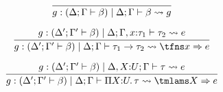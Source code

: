   \centering
{}
\newcommand{\ghole}{%
  \Delta^\prime ; \Gamma^\prime \mid \tau^\prime
}
%
\newcommand{\conc}[2]{%
  \unrolljudg{\goalwith {\goalctx{^\prime}} \beta}{\goalctx{}}{#1}{#2}
}
\newcommand{\prem}[2]{%
  \unrolljudg{\goalwith {\goalctx{^\prime}} \beta}{#1}{e}{#2}
}
%
\[
  \begin{array}{c}
  \infer{%
    \unrolljudg{\goalwith{\goalctx{}} \beta}{\goalctx{}}{g}{\beta}
  }{
  }
    \\[1em]
  \infer{%
    \conc{\tfns x \bto e}{\tau_1 \to \tau_2}
  }{
    \prem{\Delta; \Gamma, x{:}\tau_1}{\tau_2}
  }
  \\[1em]
  \infer{%
    \conc{\tmlams X \bto e}{\Pi X{:}U.\, \tau}
  }{
    \prem{\Delta, X{:}U; \Gamma}{\tau}
  }
  \end{array}
\]
